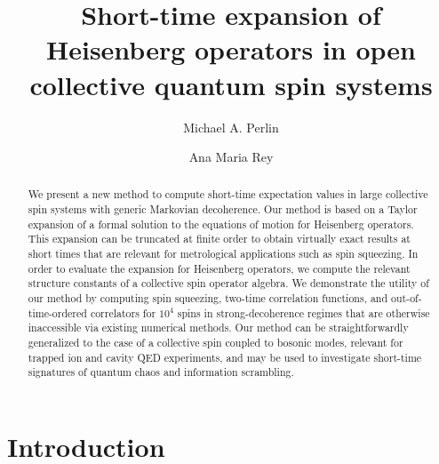 \documentclass[aps,pra,twocolumn,longbibliography]{revtex4-2}
\newcommand{\1}{\mathds{1}}
\begin{document}
\title{Short-time expansion of Heisenberg operators in open collective
  quantum spin systems}

\author{Michael A. Perlin}
\author{Ana Maria Rey}

\begin{abstract}
  We present a new method to compute short-time expectation values in
  large collective spin systems with generic Markovian decoherence.
  Our method is based on a Taylor expansion of a formal solution to
  the equations of motion for Heisenberg operators.  This expansion
  can be truncated at finite order to obtain virtually exact results
  at short times that are relevant for metrological applications such
  as spin squeezing.  In order to evaluate the expansion for
  Heisenberg operators, we compute the relevant structure constants of
  a collective spin operator algebra.  We demonstrate the utility of
  our method by computing spin squeezing, two-time correlation
  functions, and out-of-time-ordered correlators for $10^4$ spins in
  strong-decoherence regimes that are otherwise inaccessible via
  existing numerical methods.  Our method can be straightforwardly
  generalized to the case of a collective spin coupled to bosonic
  modes, relevant for trapped ion and cavity QED experiments, and may
  be used to investigate short-time signatures of quantum chaos and
  information scrambling.
\end{abstract}

\maketitle

\section{Introduction}
\end{document}
